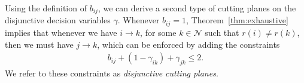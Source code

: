 \documentclass{report}
\theoremstyle{definition}
\theoremstyle{plain}
\begin{document}
Using the definition of $b_{ij}$, we can derive a second type of cutting planes
on the disjunctive decision variables $\gamma$. Whenever $b_{ij} = 1$, Theorem~\ref{thm:exhaustive}
implies that whenever we have $i \rightarrow k$, for some $k \in \mathcal{N}$ such that
$r(i) \neq r(k)$, then we must have $j \rightarrow k$, which can be enforced by adding the
constraints
\begin{subequations}
\begin{align}
  b_{ij} + (1 - \gamma_{ik}) + \gamma_{jk} \leq 2 . \tag{disj.cut}
\end{align}
\end{subequations}
We refer to these constraints as \emph{disjunctive cutting planes}.

\end{document}
